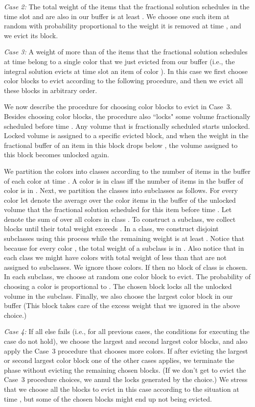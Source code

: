 \documentclass[12pt]{article}
\begin{document}
{\em Case 2:}\/ The total weight of the items that the
fractional solution schedules in the time slot  
and are also in our buffer is at least 
. We choose one such item at random with 
probability proportional to the weight it is removed at
time , and we evict its block.

{\em Case 3:}\/ A weight of more than  of
the items that the fractional solution schedules at time
 belong to a single color  that we just evicted
from our buffer (i.e., the integral solution evicts at time 
slot  an item of color ). 
In this case we first choose color
blocks to evict according to the following procedure, 
and then we evict all these blocks in arbitrary order.

We now describe the procedure for choosing color
blocks to evict in Case~3. Besides choosing color
blocks, the procedure also ``locks" some volume
fractionally scheduled before time . Any volume
that is fractionally scheduled starts unlocked. Locked
volume is assigned to a specific evicted block, and
when the weight in the fractional buffer of an item 
in this block drops below , the volume
assigned to this block becomes unlocked again.
 
We partition the colors into classes according to the
number of items in the buffer of each color at time .
A color  is in class  iff the
number of items in the buffer of color  is in .
Next, we partition the classes into subclasses as follows.
For every color  let  denote the average over the 
color  items in the buffer of the unlocked volume
that the fractional solution scheduled for this item
before time . Let  denote the sum of 
over all colors  in class . To construct a subclass, 
we collect
blocks until their total  weight exceeds .
In a class, we construct disjoint subclasses using this
process while the remaining weight is at least .
Notice that because  for every color ,
the total weight of a subclass is in .
Also notice that in each class we might have colors with
total  weight of less than  that are not
assigned to subclasses. We ignore those colors. If 
 then no block of class  is chosen.
In each subclass, we choose at random one color block 
to evict. The probability of choosing a color  is 
proportional to . The chosen block locks all
the unlocked volume in the subclass. Finally, we also 
choose the largest color block in our buffer (This block 
takes care of the excess weight that we ignored in the 
above choice.)

{\em Case 4:}\/ If all else fails (i.e., for all previous
cases, the conditions for executing the case do not
hold), we choose the largest
and second largest color blocks, and also apply the
Case~3 procedure that chooses more colors. If after 
evicting the largest or second largest color block one 
of the other cases applies, 
we terminate the phase without evicting the remaining
chosen blocks. (If we don't get to evict the Case~3
procedure choices, we annul the locks generated by 
the choice.) We stress that we choose all the blocks to 
evict in this case according to the situation at time ,
but some of the chosen blocks might end up not being
evicted.
\end{document}
